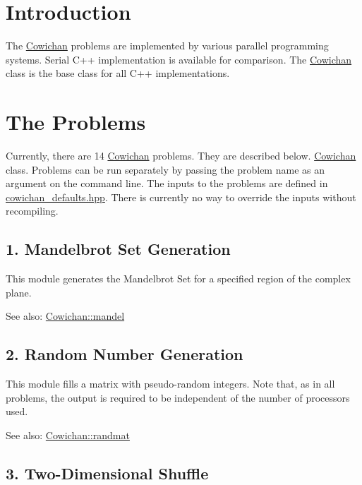 \hypertarget{index_intro_sec}{}\section{Introduction}\label{index_intro_sec}
The \hyperlink{class_cowichan}{Cowichan} problems are implemented by various parallel programming systems. Serial C++ implementation is available for comparison. The \hyperlink{class_cowichan}{Cowichan} class is the base class for all C++ implementations.\hypertarget{index_problems_sec}{}\section{The Problems}\label{index_problems_sec}
Currently, there are 14 \hyperlink{class_cowichan}{Cowichan} problems. They are described below. \hyperlink{class_cowichan}{Cowichan} class. Problems can be run separately by passing the problem name as an argument on the command line. The inputs to the problems are defined in \hyperlink{cowichan__defaults_8hpp}{cowichan\_\-defaults.hpp}. There is currently no way to override the inputs without recompiling.\hypertarget{index_mandel_sec}{}\subsection{1. Mandelbrot Set Generation}\label{index_mandel_sec}
This module generates the Mandelbrot Set for a specified region of the complex plane. \begin{Desc}
\item[See also:]\hyperlink{class_cowichan_ec6cc4eb2ad444474b923532167e98a2}{Cowichan::mandel}\end{Desc}
\hypertarget{index_randmat_sec}{}\subsection{2. Random Number Generation}\label{index_randmat_sec}
This module fills a matrix with pseudo-random integers. Note that, as in all problems, the output is required to be independent of the number of processors used. \begin{Desc}
\item[See also:]\hyperlink{class_cowichan_c44cacf9d9e363a5b076bcee8b9a7a73}{Cowichan::randmat}\end{Desc}
\hypertarget{index_half_sec}{}\subsection{3. Two-Dimensional Shuffle}\label{index_half_sec}
